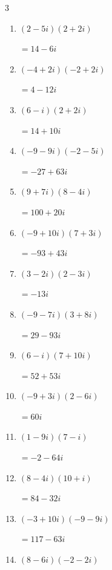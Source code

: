 \begin{multicols}{3}
\begin{enumerate}
  \item $\displaystyle (2-5i)(2+2i)$

        $\displaystyle =14-6i$

  \item $\displaystyle (-4+2i)(-2+2i)$

        $\displaystyle =4-12i$

\columnbreak %

  \item $\displaystyle (6-i)(2+2i)$

        $\displaystyle =14+10i$

  \item $\displaystyle (-9-9i)(-2-5i)$

        $\displaystyle =-27+63i$

  \item $\displaystyle (9+7i)(8-4i)$

        $\displaystyle =100+20i$

  \item $\displaystyle (-9+10i)(7+3i)$

        $\displaystyle =-93+43i$

  \item $\displaystyle (3-2i)(2-3i)$

        $\displaystyle =-13i$

  \item $\displaystyle (-9-7i)(3+8i)$

        $\displaystyle =29-93i$

  \item $\displaystyle (6-i)(7+10i)$

        $\displaystyle =52+53i$

  \item $\displaystyle (-9+3i)(2-6i)$

        $\displaystyle =60i$

  \item $\displaystyle (1-9i)(7-i)$

        $\displaystyle =-2-64i$

  \item $\displaystyle (8-4i)(10+i)$

        $\displaystyle =84-32i$

  \item $\displaystyle (-3+10i)(-9-9i)$

        $\displaystyle =117-63i$

  \item $\displaystyle (8-6i)(-2-2i)$


\end{enumerate}
\end{multicols}
